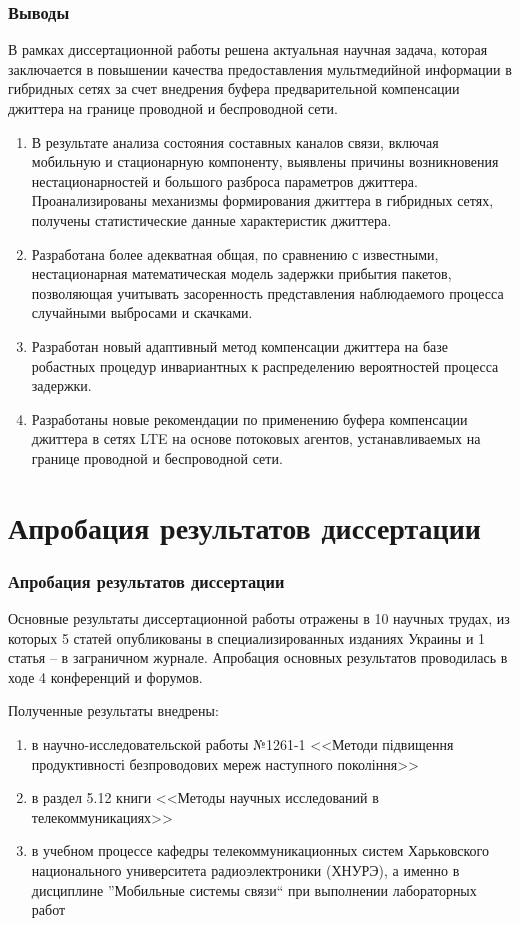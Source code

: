\documentclass[10pt,pdf,hyperref={unicode}]{beamer}
\begin{document}
\begin{frame}
\frametitle{Выводы}



{\small

В рамках диссертационной работы решена актуальная научная задача, которая заключается в повышении качества предоставления мультмедийной информации в гибридных сетях за счет внедрения буфера предварительной компенсации джиттера на границе проводной и беспроводной сети.
}

\begin{footnotesize}
\begin{enumerate}
  \item В результате анализа состояния составных каналов связи, включая мобильную и стационарную компоненту, выявлены причины возникновения нестационарностей и большого разброса параметров джиттера.
  Проанализированы механизмы формирования джиттера в гибридных сетях, получены статистические данные характеристик джиттера.
  \item Разработана более адекватная общая, по сравнению с известными, нестационарная математическая модель задержки прибытия пакетов,
  позволяющая учитывать засоренность представления наблюдаемого процесса случайными выбросами и скачками.
  \item 
  Разработан новый адаптивный метод компенсации джиттера на базе робастных процедур инвариантных к распределению вероятностей процесса задержки.
  \item 
  Разработаны новые рекомендации по применению буфера компенсации джиттера в сетях LTE на основе потоковых агентов, устанавливаемых на границе проводной и беспроводной сети.
\end{enumerate}
\end{footnotesize}


\end{frame}


\section{Апробация результатов диссертации}

\begin{frame}
\frametitle{Апробация результатов диссертации}
Основные результаты диссертационной работы отражены в 10 научных трудах, из которых  5  статей опубликованы в специализированных изданиях Украины и 1 статья – в заграничном журнале.
Апробация основных результатов проводилась в ходе 4 конференций и форумов.

Полученные результаты внедрены: 
\begin{enumerate}
\item в научно-исследовательской работы №1261-1 <<Методи підвищення продуктивності безпроводових мереж наступного покоління>>
\item в раздел 5.12 книги <<Методы научных исследований в телекоммуникациях>>
\item в учебном процессе кафедры телекоммуникационных систем Харьковского национального университета радиоэлектроники (ХНУРЭ), а именно в дисциплине ''Мобильные системы связи`` при выполнении лабораторных работ
\end{enumerate}
 

\end{frame}
\end{document}
